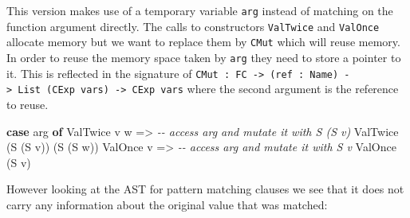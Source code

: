 \documentclass[
]{article}
\newenvironment{Shaded}{}{}
\newcommand{\CommentTok}[1]{\textcolor[rgb]{0.38,0.63,0.69}{\textit{#1}}}
\newcommand{\DataTypeTok}[1]{\textcolor[rgb]{0.56,0.13,0.00}{#1}}
\newcommand{\KeywordTok}[1]{\textcolor[rgb]{0.00,0.44,0.13}{\textbf{#1}}}
\newcommand{\NormalTok}[1]{#1}
\newcommand{\OtherTok}[1]{\textcolor[rgb]{0.00,0.44,0.13}{#1}}
\begin{document}
This version makes use of a temporary variable \texttt{arg} instead of
matching on the function argument directly. The calls to constructors
\texttt{ValTwice} and \texttt{ValOnce} allocate memory but we want to
replace them by \texttt{CMut} which will reuse memory. In order to reuse
the memory space taken by \texttt{arg} they need to store a pointer to
it. This is reflected in the signature of
\texttt{CMut\ :\ FC\ -\textgreater{}\ (ref\ :\ Name)\ -\textgreater{}\ List\ (CExp\ vars)\ -\textgreater{}\ CExp\ vars}
where the second argument is the reference to reuse.

\begin{Shaded}
\begin{Highlighting}[]
\KeywordTok{case}\NormalTok{ arg }\KeywordTok{of}
     \DataTypeTok{ValTwice}\NormalTok{ v w }\OtherTok{=\textgreater{}} \CommentTok{{-}{-} access \textasciigrave{}arg\textasciigrave{} and mutate it with S (S v)}
                     \DataTypeTok{ValTwice}\NormalTok{ (}\DataTypeTok{S}\NormalTok{ (}\DataTypeTok{S}\NormalTok{ v)) (}\DataTypeTok{S}\NormalTok{ (}\DataTypeTok{S}\NormalTok{ w))}
     \DataTypeTok{ValOnce}\NormalTok{ v }\OtherTok{=\textgreater{}} \CommentTok{{-}{-} access \textasciigrave{}arg\textasciigrave{} and mutate it with S v}
                  \DataTypeTok{ValOnce}\NormalTok{ (}\DataTypeTok{S}\NormalTok{ v)}
\end{Highlighting}
\end{Shaded}

However looking at the AST for pattern matching clauses we see that it
does not carry any information about the original value that was
matched:
\end{document}
